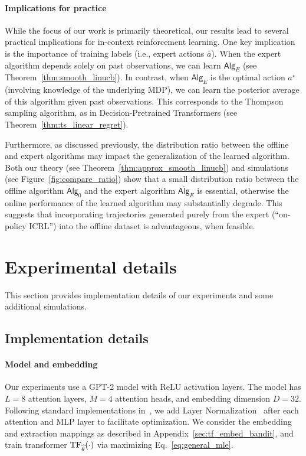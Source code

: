 \documentclass[10pt]{article}
\newcommand{\<}{\left\langle}
\renewcommand{\>}{\right\rangle}
\newcommand{\TF}{{\rm TF}}
\newcommand{\widebar}[1]{\overline{#1}}
\newcommand{\eaction}{{\widebar{a}}}
\newcommand{\sAlg}{{\mathsf{Alg}}}
\newcommand{\osAlg}{\overline{\mathsf{Alg}}}
\newcommand{\EstPar}{{\widehat{\theta}}}
\newcommand{\shortexp}{{E}}
\begin{document}
\paragraph{Implications for practice} While the focus of our work is primarily theoretical, our results lead to several practical implications for in-context reinforcement learning. One key implication is the importance of training labels (i.e., expert actions $\eaction$). When the expert algorithm depends solely on past observations, we can learn ${\sAlg}_{\shortexp}$ (see Theorem~\ref{thm:smooth_linucb}). In contrast, when ${\sAlg}_{\shortexp}$ is the optimal action $a^\star$ (involving knowledge of the underlying MDP), we can learn the posterior average of this algorithm given past observations. This corresponds to the Thompson sampling algorithm, as in Decision-Pretrained Transformers (see Theorem~\ref{thm:ts_linear_regret}). 

Furthermore, as discussed previously, the distribution ratio between the offline and expert algorithms may impact the generalization of the learned algorithm. Both our theory (see Theorem~\ref{thm:approx_smooth_linucb}) and simulations (see Figure~\ref{fig:compare_ratio}) show that a small distribution ratio between the offline algorithm $\sAlg_0$ and the expert algorithm $\osAlg_{\shortexp}$ is essential, otherwise the online performance of the learned algorithm may substantially degrade. This suggests that incorporating trajectories generated purely from the expert (``on-policy ICRL'') into the offline dataset is advantageous, when feasible. 


\section{Experimental details}\label{sec:exp_details}



This section provides implementation details of our experiments and some additional simulations.


\subsection{Implementation details}
\paragraph{Model and embedding}

Our experiments use a GPT-2 model \citep{radford2019language} with ReLU activation layers. The model has $L=8$ attention layers, $M=4$ attention heads, and embedding dimension $D=32$. Following standard implementations in~\cite{vaswani2017attention}, we add Layer Normalization~\citep{ba2016layer} after each attention and MLP layer to facilitate optimization. We consider the embedding and extraction mappings as described in Appendix~\ref{sec:tf_embed_bandit}, and train transformer $\TF_{\EstPar}(\cdot)$ via  maximizing Eq.~\eqref{eq:general_mle}.
\end{document}
